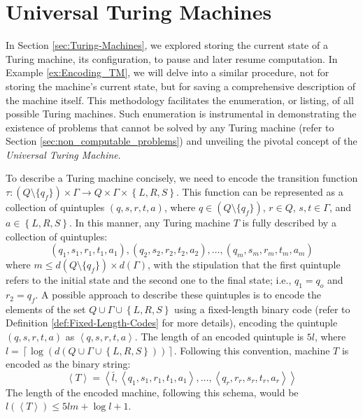 %
%

\section{Universal Turing Machines}
\label{sec:Universal-Turing-Machines}

In Section \ref{sec:Turing-Machines}, we explored storing the current state of a Turing machine, its configuration, to pause and later resume computation. In Example \ref{ex:Encoding_TM}, we will delve into a similar procedure, not for storing the machine's current state, but for saving a comprehensive description of the machine itself. This methodology facilitates the enumeration, or listing, of all possible Turing machines. Such enumeration is instrumental in demonstrating the existence of problems that cannot be solved by any Turing machine (refer to Section \ref{sec:non_computable_problems}) and unveiling the pivotal concept of the \emph{Universal Turing Machine}.

\begin{example}
\label{ex:Encoding_TM}
To describe a Turing machine concisely, we need to encode the transition function $\tau:\left(Q\setminus \{q_{f}\}\right)\times\Gamma\rightarrow Q\times\Gamma\times\left\{ L,R,S\right\}$. This function can be represented as a collection of quintuples $\left(q,s,r,t,a\right)$, where $q \in \left(Q\setminus \{q_{f}\}\right)$, $r \in Q$, $s, t\in\Gamma$, and $a\in\left\{ L,R,S\right\}$. In this manner, any Turing machine $T$ is fully described by a collection of quintuples:
\[
\left(q_{1},s_{1},r_{1},t_{1},a_{1}\right),\left(q_{2},s_{2},r_{2},t_{2},a_{2}\right),\ldots,\left(q_{m},s_
{m},r_{m},t_{m},a_{m}\right)
\]
where $m \leq d\left(Q\setminus \{q_{f}\}\right) \times d(\Gamma)$, with the stipulation that the first quintuple refers to the initial state and the second one to the final state; i.e., $q_{1} = q_{o}$ and $r_{2} = q_{f}$. A possible approach to describe these quintuples is to encode the elements of the set $Q\cup\Gamma\cup\left\{ L, R, S \right\}$ using a fixed-length binary code (refer to Definition \ref{def:Fixed-Length-Codes} for more details), encoding the quintuple $\left(q,s,r,t,a\right)$ as $\left\langle q, s, r, t, a \right\rangle$. The length of an encoded quintuple is $5l$, where $l=\left\lceil \log\left(d\left(Q\cup\Gamma\cup\left\{ L,R,S\right\}\right)\right)\right\rceil$. Following this convention, machine $T$ is encoded as the binary string:
\[
\left\langle T \right\rangle = \left\langle \bar{l}, \left\langle q_{1}, s_{1}, r_{1}, t_{1}, a_{1} \right\rangle, \ldots, \left\langle q_{r}, r_{r}, s_{r}, t_{r}, a_{r} \right\rangle \right\rangle 
\]
The length of the encoded machine, following this schema, would be $l(\left\langle T \right\rangle) \leq 5lm + \log l + 1$.
\end{example}

